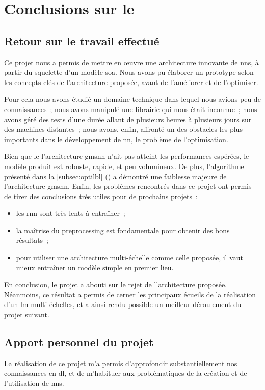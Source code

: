 \chapter{Conclusions sur le }
\section{Retour sur le travail effectué}
Ce projet nous a permis de mettre en œuvre une architecture innovante de \glspl{nn}, à partir du squelette d'un modèle \gls{soa}.
Nous avons pu élaborer un prototype selon les concepts clés de l'architecture proposée, avant de l'améliorer et de l'optimiser.

Pour cela nous avons étudié un domaine technique dans lequel nous avions peu de connaissances~; nous avons manipulé une librairie qui nous était inconnue~;
nous avons géré des tests d'une durée allant de plusieurs heures à plusieurs jours sur des machines distantes~; nous avons, enfin, affronté un des obstacles les plus importants dans le développement de \gls{nn}, le problème de l'optimisation.

Bien que le l'architecture \gls{gmsnn} n'ait pas atteint les performances espérées, le modèle produit est robuste, rapide, et peu volumineux.
De plus, l'algorithme présenté dans la \autoref{subsec:optilbl} () a démontré une faiblesse majeure de l'architecture \gls{gmsnn}.
Enfin, les problèmes rencontrés dans ce projet ont permis de tirer des conclusions très utiles pour de prochains projets~:
\begin{itemize}
	\item les \gls{rnn} sont très lents à entraîner~;
	\item la maîtrise du \gls{preprocessing} est fondamentale pour obtenir des bons résultats~;
	\item pour utiliser une architecture multi-échelle comme celle proposée, il vaut mieux entraîner un modèle simple en premier lieu.
\end{itemize}\hspace{1em}

En conclusion, le projet a abouti sur le rejet de l'architecture proposée.
Néanmoins, ce résultat a permis de cerner les principaux écueils de la réalisation d'un \gls{lm} multi-échelles, et a ainsi rendu possible un meilleur déroulement du projet suivant.


\section{Apport personnel du projet}
La réalisation de ce projet m'a permis d'approfondir substantiellement nos connaissances en \gls{dl}, et de m'habituer aux problématiques de la création et de l'utilisation de \glspl{nn}.

